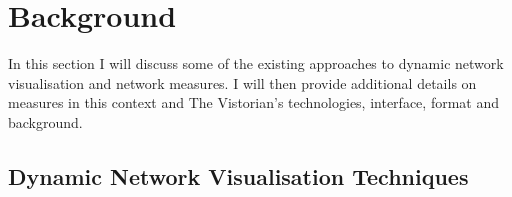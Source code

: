 
\chapter{Background}

In this section I will discuss some of the existing approaches to dynamic network visualisation and network measures. I will then provide additional details on measures in this context and The Vistorian's technologies, interface, format and background.

\section{Dynamic Network Visualisation Techniques}



